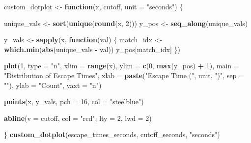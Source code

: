 \documentclass[
]{article}
\newenvironment{Shaded}{\begin{snugshade}}{\end{snugshade}}
\newcommand{\AttributeTok}[1]{\textcolor[rgb]{0.13,0.29,0.53}{#1}}
\newcommand{\ControlFlowTok}[1]{\textcolor[rgb]{0.13,0.29,0.53}{\textbf{#1}}}
\newcommand{\DecValTok}[1]{\textcolor[rgb]{0.00,0.00,0.81}{#1}}
\newcommand{\FunctionTok}[1]{\textcolor[rgb]{0.13,0.29,0.53}{\textbf{#1}}}
\newcommand{\NormalTok}[1]{#1}
\newcommand{\OtherTok}[1]{\textcolor[rgb]{0.56,0.35,0.01}{#1}}
\newcommand{\SpecialCharTok}[1]{\textcolor[rgb]{0.81,0.36,0.00}{\textbf{#1}}}
\newcommand{\StringTok}[1]{\textcolor[rgb]{0.31,0.60,0.02}{#1}}
\begin{document}
\begin{Shaded}
\begin{Highlighting}[]
\NormalTok{custom\_dotplot }\OtherTok{\textless{}{-}} \ControlFlowTok{function}\NormalTok{(x, cutoff, }\AttributeTok{unit =} \StringTok{"seconds"}\NormalTok{) \{}

\NormalTok{  unique\_vals }\OtherTok{\textless{}{-}} \FunctionTok{sort}\NormalTok{(}\FunctionTok{unique}\NormalTok{(}\FunctionTok{round}\NormalTok{(x, }\DecValTok{2}\NormalTok{)))}
\NormalTok{  y\_pos }\OtherTok{\textless{}{-}} \FunctionTok{seq\_along}\NormalTok{(unique\_vals)}
  
\NormalTok{  y\_vals }\OtherTok{\textless{}{-}} \FunctionTok{sapply}\NormalTok{(x, }\ControlFlowTok{function}\NormalTok{(val) \{}
\NormalTok{    match\_idx }\OtherTok{\textless{}{-}} \FunctionTok{which.min}\NormalTok{(}\FunctionTok{abs}\NormalTok{(unique\_vals }\SpecialCharTok{{-}}\NormalTok{ val))}
\NormalTok{    y\_pos[match\_idx]}
\NormalTok{  \})}

  \FunctionTok{plot}\NormalTok{(}\DecValTok{1}\NormalTok{, }\AttributeTok{type =} \StringTok{"n"}\NormalTok{, }
       \AttributeTok{xlim =} \FunctionTok{range}\NormalTok{(x), }
       \AttributeTok{ylim =} \FunctionTok{c}\NormalTok{(}\DecValTok{0}\NormalTok{, }\FunctionTok{max}\NormalTok{(y\_pos) }\SpecialCharTok{+} \DecValTok{1}\NormalTok{),}
       \AttributeTok{main =} \StringTok{"Distribution of Escape Times"}\NormalTok{,}
       \AttributeTok{xlab =} \FunctionTok{paste}\NormalTok{(}\StringTok{"Escape Time ("}\NormalTok{, unit, }\StringTok{")"}\NormalTok{, }\AttributeTok{sep =} \StringTok{""}\NormalTok{),}
       \AttributeTok{ylab =} \StringTok{"Count"}\NormalTok{, }\AttributeTok{yaxt =} \StringTok{"n"}\NormalTok{)}
  
  \FunctionTok{points}\NormalTok{(x, y\_vals, }\AttributeTok{pch =} \DecValTok{16}\NormalTok{, }\AttributeTok{col =} \StringTok{"steelblue"}\NormalTok{)}
  
  \FunctionTok{abline}\NormalTok{(}\AttributeTok{v =}\NormalTok{ cutoff, }\AttributeTok{col =} \StringTok{"red"}\NormalTok{, }\AttributeTok{lty =} \DecValTok{2}\NormalTok{, }\AttributeTok{lwd =} \DecValTok{2}\NormalTok{)}
  
\NormalTok{\}}
\FunctionTok{custom\_dotplot}\NormalTok{(escape\_times\_seconds, cutoff\_seconds, }\StringTok{"seconds"}\NormalTok{)}
\end{Highlighting}
\end{Shaded}
\end{document}
